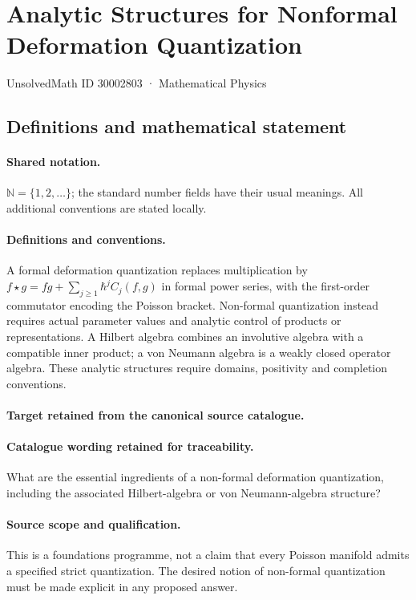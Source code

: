 \documentclass[11pt]{article}
\begin{document}
\setcounter{section}{30002802}
\section{Analytic Structures for Nonformal Deformation Quantization}\label{30002803}
{\small UnsolvedMath ID 30002803 · Mathematical Physics}
\subsection{Definitions and mathematical statement}

\paragraph{Shared notation.}$\mathbb N=\{1,2,\ldots\}$; the standard number fields have their usual meanings. All additional conventions are stated locally.


\paragraph{Definitions and conventions.}
A formal deformation quantization replaces multiplication by $f\star g=fg+\sum_{j\geq1}\hbar^j C_j(f,g)$ in formal power series, with the first-order commutator encoding the Poisson bracket. Non-formal quantization instead requires actual parameter values and analytic control of products or representations. A Hilbert algebra combines an involutive algebra with a compatible inner product; a von Neumann algebra is a weakly closed operator algebra. These analytic structures require domains, positivity and completion conventions.

\paragraph{Target retained from the canonical source catalogue.}
\paragraph{Catalogue wording retained for traceability.}
What are the essential ingredients of a non-formal deformation quantization, including the associated Hilbert-algebra or von Neumann-algebra structure?

\paragraph{Source scope and qualification.}
This is a foundations programme, not a claim that every Poisson manifold admits a specified strict quantization. The desired notion of non-formal quantization must be made explicit in any proposed answer.
\end{document}
